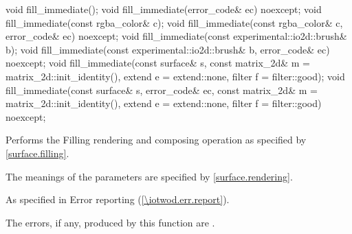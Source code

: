 \begin{itemdecl}
void fill_immediate();
void fill_immediate(error_code& ec) noexcept;
void fill_immediate(const rgba_color& c);
void fill_immediate(const rgba_color& c, error_code& ec) noexcept;
void fill_immediate(const experimental::io2d::brush& b);
void fill_immediate(const experimental::io2d::brush& b, error_code& ec)
  noexcept;
void fill_immediate(const surface& s, 
  const matrix_2d& m = matrix_2d::init_identity(),
  extend e = extend::none, filter f = filter::good);
void fill_immediate(const surface& s, error_code& ec, 
  const matrix_2d& m = matrix_2d::init_identity(),
  extend e = extend::none, filter f = filter::good) noexcept;
\end{itemdecl}
\begin{itemdescr}
\pnum
\effects
Performs the Filling rendering and composing operation as specified by \ref{surface.filling}.

\pnum
The meanings of the parameters are specified by \ref{surface.rendering}.

\pnum
\throws
As specified in Error reporting (\ref{\iotwod.err.report}).

\pnum
\errors
The errors, if any, produced by this function are .
\end{itemdescr}

